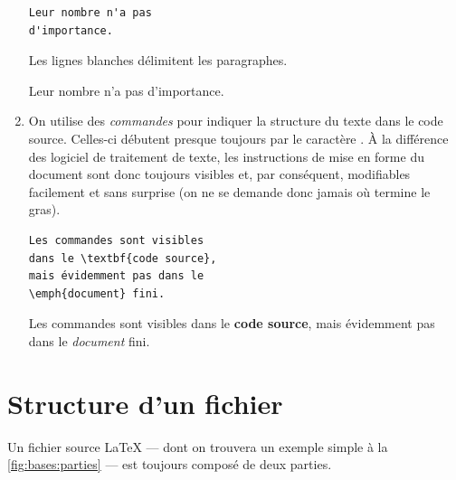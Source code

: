\begin{enumerate}
\begin{demo}
\begin{texample}
\begin{lstlisting}
Leur nombre n'a pas
d'importance.
\end{lstlisting}
      \producing
        Les lignes blanches  délimitent
        les paragraphes.



        Leur nombre n'a pas
        d'importance.
    \end{texample}
  \end{demo}
%
\item On utilise des \emph{commandes} pour indiquer la structure du
  texte dans le code source. Celles-ci débutent presque toujours par
  le caractère {\bs}. À la différence des logiciel de traitement de
  texte, les instructions de mise en forme du document sont donc
  toujours visibles et, par conséquent, modifiables facilement et sans
  surprise (on ne se demande donc jamais où termine le gras).
  \begin{demo}
    \begin{texample}
\begin{lstlisting}
Les commandes sont visibles
dans le \textbf{code source},
mais évidemment pas dans le
\emph{document} fini.
\end{lstlisting}
      \producing
      Les commandes sont visibles
      dans le \textbf{code source},
      mais évidemment pas dans le
      \emph{document} fini.
    \end{texample}
  \end{demo}
\end{enumerate}


\section{Structure d'un fichier}
\label{sec:bases:structure}

Un fichier source {\LaTeX} --- dont on trouvera un exemple simple à la
\autoref{fig:bases:parties} --- est toujours composé de deux parties.

